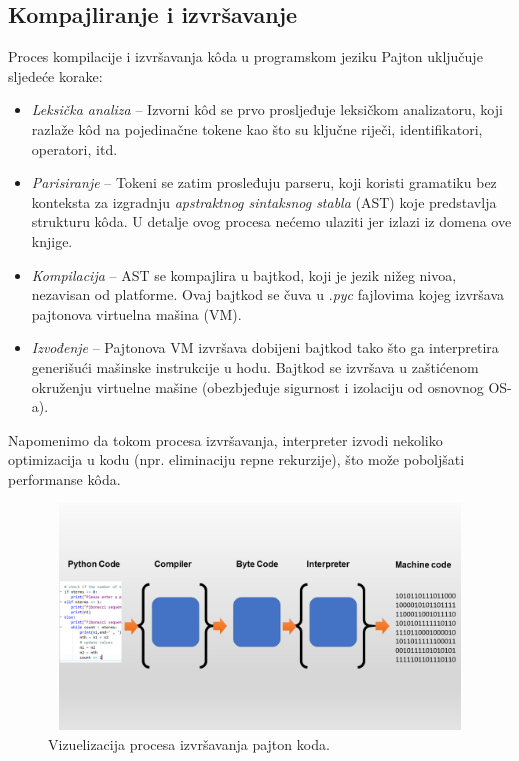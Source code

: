 \subsection{Kompajliranje i izvršavanje}

Proces kompilacije   i izvršavanja k\^oda u programskom jeziku Pajton uključuje sljedeće korake:

\begin{itemize}
	\item \textit{Leksička analiza} -- Izvorni k\^od se prvo prosljeđuje leksičkom analizatoru,  koji razlaže k\^od na pojedinačne tokene kao što su ključne riječi, identifikatori, operatori, itd.
	\item \textit{Parisiranje} -- Tokeni se zatim prosleđuju parseru, koji koristi gramatiku bez konteksta za izgradnju \emph{apstraktnog sintaksnog stabla} (AST) koje predstavlja strukturu k\^oda. U detalje ovog procesa nećemo ulaziti jer izlazi iz domena ove knjige.
	\item \textit{Kompilacija} -- AST se kompajlira u bajtkod, koji je jezik nižeg nivoa,   nezavisan od platforme.  Ovaj bajtkod se čuva u .\textit{pyc} fajlovima kojeg izvršava   pajtonova virtuelna mašina (VM).
	\item \textit{Izvođenje} -- Pajtonova VM izvršava dobijeni bajtkod tako što ga interpretira generišući mašinske instrukcije u hodu. Bajtkod se izvršava u zaštićenom okruženju virtuelne mašine (obezbjeđuje sigurnost i izolaciju od osnovnog OS-a).  
	
\end{itemize}
Napomenimo da tokom procesa izvršavanja, interpreter izvodi nekoliko optimizacija u kodu (npr. eliminaciju repne rekurzije), što može poboljšati performanse k\^oda.
\begin{figure}[H]	
	\centering
	
	\includegraphics[width=350pt,height=170pt]{slike/python-code-copiler-machine-code.png}%
\caption{Vizuelizacija procesa izvršavanja pajton koda.}
\label{fig:comp_interpreting}
\end{figure}

